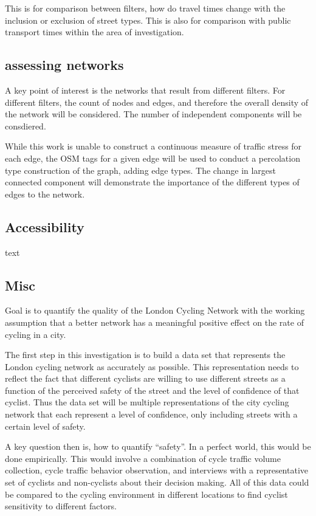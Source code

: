  This is for comparison between filters, how do travel times change with the inclusion or exclusion of street types. This is also for comparison with public transport times within the area of investigation. 

\subsection{assessing networks}

A key point of interest is the networks that result from different filters. For different filters, the count of nodes and edges, and therefore the overall density of the network will be considered. The number of independent components will be consdiered. 

While this work is unable to construct a continuous measure of traffic stress for each edge, the OSM tags for a given edge will be used to conduct a percolation type construction of the graph, adding edge types. The change in largest connected component will demonstrate the importance of the different types of edges to the network. 


\subsection{Accessibility}

text


\subsection{Misc}


Goal is to quantify the quality of the London Cycling Network with the working assumption that a better network has a meaningful positive effect on the rate of cycling in a city. 

The first step in this investigation is to build a data set that represents the London cycling network as accurately as possible. This representation needs to reflect the fact that different cyclists are willing to use different streets as a function of the perceived safety of the street and the level of confidence of that cyclist. Thus the data set will be multiple representations of the city cycling network that each represent a level of confidence, only including streets with a certain level of safety. 

A key question then is, how to quantify ``safety''. In a perfect world, this would be done empirically. This would involve a combination of cycle traffic volume collection, cycle traffic behavior observation, and interviews with a representative set of cyclists and non-cyclists about their decision making. All of this data could be compared to the cycling environment in different locations to find cyclist sensitivity to different factors.  


